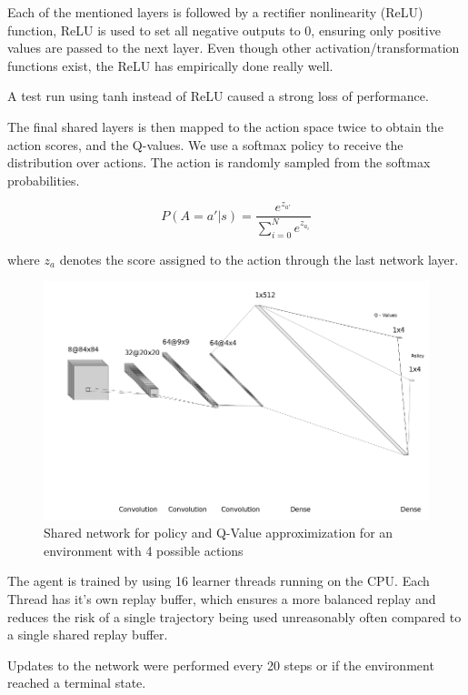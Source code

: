 Each of the mentioned layers is followed by a rectifier nonlinearity (ReLU) function, ReLU is used to set all negative outputs to 0, ensuring only positive values are passed to the next layer.
Even though other activation/transformation functions exist, the ReLU has empirically done really well. 

A test run using tanh instead of ReLU caused a strong loss of performance.

The final shared layers is then mapped to the action space twice to obtain the action scores, and the Q-values. We use a softmax policy to receive the distribution over actions.
The action is randomly sampled from the softmax probabilities.

\begin{equation}
P(A = a' | s ) = \frac{e^{z_{a'}}}{\sum^N_{i=0}e^{z_{a_i}}} 
\end{equation}

where $z_{a}$ denotes the score assigned to the action through the last network layer.


\begin{figure}
\includegraphics[scale=0.5]{bilder/nn2.png}
\caption{Shared network for policy and Q-Value approximization for an environment with 4 possible actions}
\end{figure}

The agent is trained by using 16 learner threads running on the CPU. Each Thread has it's own replay buffer, which ensures a more balanced replay and reduces the risk of a single trajectory being used unreasonably often compared to a single shared replay buffer.

Updates to the network were performed every 20 steps or if the environment reached a terminal state. 

